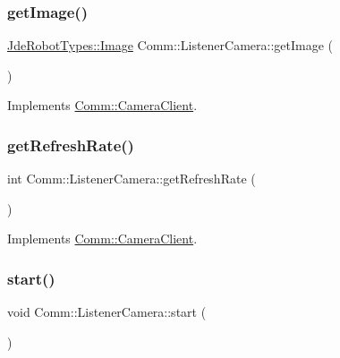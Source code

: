 \subsubsection{\texorpdfstring{get\+Image()}{getImage()}}
{\footnotesize\ttfamily \hyperlink{class_jde_robot_types_1_1_image}{Jde\+Robot\+Types\+::\+Image} Comm\+::\+Listener\+Camera\+::get\+Image (\begin{DoxyParamCaption}{ }\end{DoxyParamCaption})\hspace{0.3cm}{\ttfamily [virtual]}}



Implements \hyperlink{class_comm_1_1_camera_client_a1947976aa6b31734b9938091e63782e2}{Comm\+::\+Camera\+Client}.

\mbox{\label{class_comm_1_1_listener_camera_a7ba9f0f4210d75cbedba5a016ac60175}} 
\subsubsection{\texorpdfstring{get\+Refresh\+Rate()}{getRefreshRate()}}
{\footnotesize\ttfamily int Comm\+::\+Listener\+Camera\+::get\+Refresh\+Rate (\begin{DoxyParamCaption}{ }\end{DoxyParamCaption})\hspace{0.3cm}{\ttfamily [virtual]}}



Implements \hyperlink{class_comm_1_1_camera_client_afa8d54f4d72921376ec35607897ab5bc}{Comm\+::\+Camera\+Client}.

\mbox{\label{class_comm_1_1_listener_camera_afc4172a88e4f187bce8f809f91db7f0f}} 
\subsubsection{\texorpdfstring{start()}{start()}}
{\footnotesize\ttfamily void Comm\+::\+Listener\+Camera\+::start (\begin{DoxyParamCaption}{ }\end{DoxyParamCaption})}

